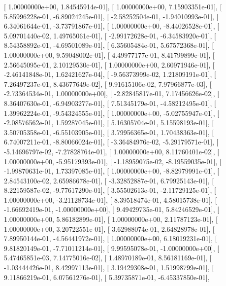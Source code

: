 \documentclass{article}
\begin{document}
       [  1.00000000e+00,   1.84545914e-01],
       [  1.00000000e+00,   7.15903351e-01],
       [  5.85996228e-01,  -6.89024245e-01],
       [ -2.58252504e-01,  -1.94010993e-01],
       [  6.34061644e-01,  -3.73791867e-01],
       [  1.00000000e+00,  -8.44026528e-01],
       [  5.09701440e-02,   1.49765061e-01],
       [ -2.99172628e-01,  -6.34583920e-01],
       [  8.54358892e-01,  -4.69501089e-01],
       [  6.35605484e-01,   5.67572368e-01],
       [  1.00000000e+00,   9.59048002e-01],
       [  4.49977177e-01,   8.41799899e-01],
       [  2.56645095e-01,   2.10129530e-01],
       [  1.00000000e+00,   2.60971946e-01],
       [ -2.46141848e-01,   1.62421627e-04],
       [ -9.56373999e-02,   1.21809191e-01],
       [  7.26497237e-01,   8.43677649e-02],
       [  9.91615106e-02,   7.97966877e-03],
       [ -2.73364534e-01,   1.00000000e+00],
       [ -2.82845817e-01,   7.17456626e-02],
       [  8.36407630e-01,  -6.94903277e-01],
       [  7.51345179e-01,  -4.58212495e-01],
       [  1.39962224e-01,  -9.54324555e-01],
       [  1.00000000e+00,  -5.02755947e-01],
       [ -2.08576562e-01,   1.59287045e-01],
       [  5.16305704e-01,   5.15598193e-01],
       [  3.50705358e-01,  -6.55103905e-01],
       [  3.79956365e-01,   1.70438363e-01],
       [  6.74007211e-01,  -8.80066024e-01],
       [ -3.36484976e-02,  -5.29179571e-01],
       [ -5.14696797e-02,  -7.27828764e-01],
       [  1.00000000e+00,   8.11760401e-02],
       [  1.00000000e+00,  -5.95179393e-01],
       [ -1.18959075e-02,  -8.19559035e-01],
       [ -1.99870631e-01,   1.73397085e-01],
       [  1.00000000e+00,  -8.82979991e-01],
       [  2.84543100e-02,   2.65986678e-01],
       [ -3.32852887e-01,   6.79925143e-01],
       [  8.22159587e-02,  -9.77617290e-01],
       [  3.55502613e-01,  -2.11729125e-01],
       [  1.00000000e+00,  -3.21128734e-01],
       [  8.39518474e-01,   4.58015738e-01],
       [ -1.66692419e-01,  -1.00000000e+00],
       [  9.49429735e-01,   5.84246529e-01],
       [  1.00000000e+00,   5.86182899e-01],
       [  1.00000000e+00,   2.11787123e-01],
       [  1.00000000e+00,   3.20722551e-01],
       [  3.62988074e-01,   2.64828978e-01],
       [  7.89950144e-01,  -4.56441972e-01],
       [  1.00000000e+00,   6.18019231e-01],
       [  9.81820149e-01,  -7.71011214e-01],
       [  9.99595078e-01,  -1.00000000e+00],
       [  5.47465851e-03,   7.14775016e-02],
       [  1.48970189e-01,   8.56181169e-01],
       [ -1.03444426e-01,   8.42997113e-01],
       [  3.19429308e-01,   1.51998799e-01],
       [  9.11866219e-01,   6.07561276e-01],
       [  5.39735871e-01,  -6.45337850e-01],
\end{document}
